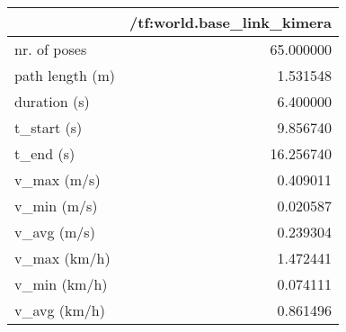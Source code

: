 \begin{tabular}{lr}
\toprule
{} &  /tf:world.base\_link\_kimera \\
\midrule
nr. of poses    &                   65.000000 \\
path length (m) &                    1.531548 \\
duration (s)    &                    6.400000 \\
t\_start (s)     &                    9.856740 \\
t\_end (s)       &                   16.256740 \\
v\_max (m/s)     &                    0.409011 \\
v\_min (m/s)     &                    0.020587 \\
v\_avg (m/s)     &                    0.239304 \\
v\_max (km/h)    &                    1.472441 \\
v\_min (km/h)    &                    0.074111 \\
v\_avg (km/h)    &                    0.861496 \\
\bottomrule
\end{tabular}
